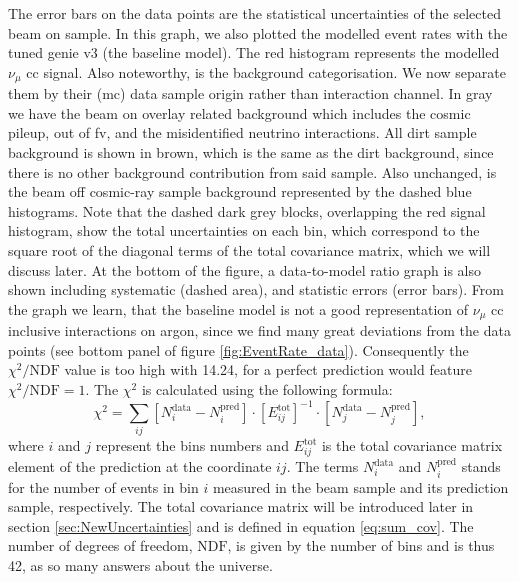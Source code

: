 The error bars on the data points are the statistical uncertainties of the selected beam on sample. In this graph, we also plotted the modelled event rates with the tuned \gls{genie} v3 (the baseline model). The red histogram represents the modelled $\nu_\mu$ \gls{cc} signal. Also noteworthy, is the background categorisation. We now separate them by their (\gls{mc}) data sample origin rather than interaction channel. In gray we have the beam on overlay related background which includes the cosmic pileup, out of \gls{fv}, and the misidentified neutrino interactions. All dirt sample background is shown in brown, which is the same as the dirt background, since there is no other background contribution from said sample. Also unchanged, is the beam off cosmic-ray sample background represented by the dashed blue histograms. Note that the dashed dark grey blocks, overlapping the red signal histogram, show the total uncertainties on each bin, which correspond to the square root of the diagonal terms of the total covariance matrix, which we will discuss later. At the bottom of the figure, a data-to-model ratio graph is also shown including systematic (dashed area), and statistic errors (error bars). From the graph we learn, that the baseline model is not a good representation of $\nu_\mu$ \gls{cc} inclusive interactions on argon, since we find many great deviations from the data points (see bottom panel of figure \ref{fig:EventRate_data}). Consequently the $\chi^2/\text{NDF}$ value is too high with \num{14.24}, for a perfect prediction would feature $\chi^2/\text{NDF} = 1$. The $\chi^2$ is calculated using the following formula:
\begin{equation}
    \chi^2 = \sum_{ij} \left[ N^{\textrm{data}}_i - N^{\textrm{pred}}_i \right] \cdot \left[ E^{\textrm{tot}}_{ij} \right]^{-1}  \cdot \left[ N^{\textrm{data}}_j - N^{\textrm{pred}}_j \right],
\end{equation}
where $i$ and $j$ represent the bins numbers and $E^{\textrm{tot}}_{ij}$ is the total covariance matrix element of the prediction at the coordinate $ij$. The terms $N^{\textrm{data}}_i$ and $N^{\textrm{pred}}_i$ stands for the number of events in bin $i$ measured in the beam sample and its prediction sample, respectively. The total covariance matrix will be introduced later in section \ref{sec:NewUncertainties} and is defined in equation \ref{eq:sum_cov}. The number of degrees of freedom, \ie $\text{NDF}$, is given by the number of bins and is thus \num{42}, as so many answers about the universe.

